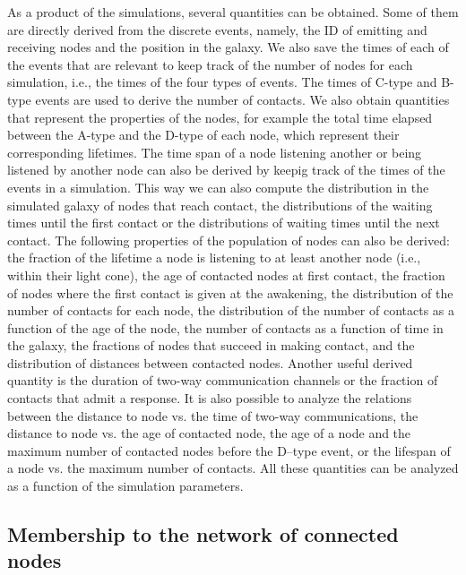\documentclass[crop]{CSLB}
\newcommand{\ceti}{node}
\newcommand{\cetis}{nodes}
\begin{document}
As a product of the simulations, several quantities can be obtained.
%
Some of them are directly derived from the discrete events, namely,
the ID of emitting and receiving \cetis{} and the position in the
galaxy.
%
We also save the times of each of the events that are relevant to keep
track of the number of \cetis{} for each simulation, i.e., the times
of the four types of events.
%
The times of C-type and B-type events are used to derive the number of
contacts.
%
We also obtain quantities that represent the properties of the
\cetis{}, for example the total time elapsed between the A-type and
the D-type of each node, which represent their corresponding
lifetimes.
%
The time span of a \ceti{} listening another or being listened by
another node can also be derived by keepig track of the times of the
events in a simulation.
%
This way we can also compute the distribution in the simulated galaxy
of \cetis{} that reach contact, the distributions of the waiting times
until the first contact or the distributions of waiting times until
the next contact.
%
The following properties of the population of \cetis{} can also be
derived:
%
the fraction of the lifetime a node is listening to at least another
node (i.e., within their light cone),
%
the age of contacted \cetis{} at first contact,
%
the fraction of \cetis{} where the first contact is given at the
awakening,
%
the distribution of the number of contacts for each \ceti{},
%
the distribution of the number of contacts as a function of the age of
the node,
%
the number of contacts as a function of time in the galaxy,
%
the fractions of nodes that succeed in making contact,
%
and the distribution of distances between contacted nodes.
%
Another useful derived quantity is the duration of two-way
communication channels or the fraction of contacts that admit a
response.
% 
It is also possible to analyze the relations between the distance to
\ceti{} vs. the time of two-way communications, the distance to
\ceti{} vs. the age of contacted node, the age of a node and the
maximum number of contacted nodes before the D--type event, or the
lifespan of a node vs. the maximum number of contacts.
%
All these quantities can be analyzed as a function of the simulation
parameters.



\subsection{Membership to the network of connected \cetis{}}\label{SS_members}
\end{document}
